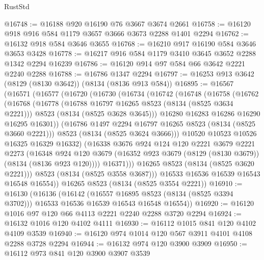 \begin{lexlean}{RustStd}
\begin{coremodule}
{\begin{coremodule}
{{{{{{{{{{{{{{{{{{{{{{{{{{{{{{{{{{{{{{{{{{{{{{{{{{{{{@16748 := @16188 @920 @16190 @76 @3667 @3674 @2661
@16758 := @16120 @918 @916 @584 @1179 @3657 @3666 @3673 @2288 @1401 @2294
@16762 := @16132 @918 @584 @3646 @3655
@16768 := @16210 @917 @16190 @584 @3646 @3653 @3428
@16778 := @16217 @916 @584 @1179 @3410 @3645 @3652 @2288 @1342 @2294 @16239
@16786 := @16120 @914 @97 @584 @66 @3642 @2221 @2240 @2288
@16788 := @16786 @1347 @2294
@16797 := @16253 @913 @3642 (@8129 (@8130 @3642)) (@8134 (@8136 @913 @584))
@16895 := @16567
    (@16571
      (@16577
        (@16720
          (@16730
            (@16734
              (@16742
                (@16748
                  (@16758
                    (@16762
                      (@16768
                        (@16778
                          (@16788 @16797 @16265 @8523 (@8134 (@8525 @3634 @2221)))
                          @8523
                          (@8134 (@8525 @3628 @3645)))
                        @16280
                        @16283
                        @16286
                        @16290
                        @16295
                        @16301))
                    (@16786 @1497 @2294 @16797 @16265 @8523 (@8134 (@8525 @3660 @2221)))
                    @8523
                    (@8134 (@8525 @3624 @3666)))
                  @10520
                  @10523
                  @10526
                  @16325
                  @16329
                  @16332)
                (@16338
                  @3676
                  @924
                  @124
                  @120
                  @2221
                  @3679
                  @2221
                  @2273
                  (@16348
                    @924
                    @120
                    @3679
                    (@16352 @923 @3679 (@8129 (@8130 @3679)) (@8134 (@8136 @923 @120))))
                  @16371)))
            @16265
            @8523
            (@8134 (@8525 @3620 @2221)))
          @8523
          (@8134 (@8525 @3558 @3687)))
        @16533
        @16536
        @16539
        @16543
        @16548
        @16554))
    @16265
    @8523
    (@8134 (@8525 @3554 @2221))
@16910 := @16130
    (@16136
      (@16142
        (@16557 @16895 @8523 (@8134 (@8525 @3394 @3702)))
        @16533
        @16536
        @16539
        @16543
        @16548
        @16554))
@16920 := @16120 @1016 @97 @120 @66 @4113 @2221 @2240 @2288 @3720 @2294
@16924 := @16132 @1016 @120 @4102 @4111
@16930 := @16112 @1015 @841 @120 @4102 @4109 @3539
@16940 := @16120 @974 @1014 @120 @567 @3911 @4101 @4108 @2288 @3728 @2294
@16944 := @16132 @974 @120 @3900 @3909
@16950 := @16112 @973 @841 @120 @3900 @3907 @3539
}}}}}}}}}}}}}}}}}}}}}}}}}}}}}}}}}}}}}}}}}}}}}}}}}}}}}
\end{coremodule}}
\end{coremodule}
\end{lexlean}

